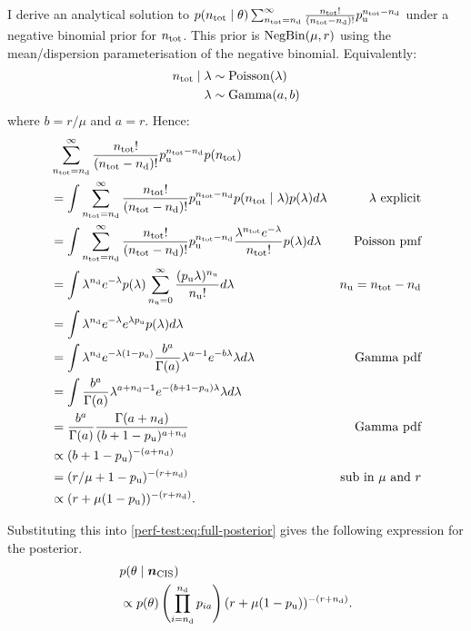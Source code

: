 \documentclass[thesis.tex]{subfiles}
\begin{document}
I derive an analytical solution to $p(n_\text{tot} \mid \theta) \sum_{n_\text{tot}=n_\text{d}}^\infty \frac{n_\text{tot}!}{(n_\text{tot} - n_\text{d})!} p_\text{u}^{n_\text{tot} - n_\text{d}}$ under a negative binomial prior for $n_\text{tot}$.
This prior is $\operatorname{NegBin}(\mu, r)$ using the mean/dispersion parameterisation of the negative binomial.
Equivalently:
\begin{align}
n_\text{tot} \mid \lambda &\sim \operatorname{Poisson}(\lambda) \\
\lambda &\sim \operatorname{Gamma}(a, b)
\end{align}
where $b = r / \mu$ and $a = r$.
Hence:
\begin{align}
&\sum_{n_\text{tot}=n_\text{d}}^\infty \frac{n_\text{tot}!}{(n_\text{tot}-n_\text{d})!} p_\text{u}^{n_\text{tot}-n_\text{d}} p(n_\text{tot}) \\
&= \int \sum_{n_\text{tot}=n_\text{d}}^\infty \frac{n_\text{tot}!}{(n_\text{tot}-n_\text{d})!} p_\text{u}^{n_\text{tot}-n_\text{d}} p(n_\text{tot} \mid \lambda) p(\lambda) d\lambda &\text{$\lambda$ explicit}\\
&= \int \sum_{n_\text{tot}=n_\text{d}}^\infty \frac{n_\text{tot}!}{(n_\text{tot}-n_\text{d})!} p_\text{u}^{n_\text{tot}-n_\text{d}} \frac{\lambda^{n_\text{tot}} e^{-\lambda}}{n_\text{tot}!} p(\lambda) d\lambda &\text{Poisson pmf}\\
&= \int \lambda^{n_\text{d}} e^{-\lambda} p(\lambda) \sum_{n_\text{u}=0}^\infty \frac{(p_\text{u} \lambda)^{n_\text{u}}}{n_\text{u}!} d\lambda &n_\text{u} = n_\text{tot}-n_\text{d}\\
&= \int \lambda^{n_\text{d}} e^{-\lambda} e^{\lambda p_\text{u}} p(\lambda) d\lambda \\
&= \int \lambda^{n_\text{d}} e^{-\lambda(1 - p_\text{u})} \frac{b^a}{\Gamma(a)} \lambda^{a-1} e^{-b\lambda} \lambda d\lambda &\text{Gamma pdf}\\
&= \int \frac{b^a}{\Gamma(a)} \lambda^{a+n_\text{d}-1} e^{-(b+1-p_\text{u})\lambda} \lambda d\lambda \\
&= \frac{b^a}{\Gamma(a)} \frac{\Gamma(a+n_\text{d})}{(b+1-p_\text{u})^{a+n_\text{d}}} &\text{Gamma pdf}\\
&\propto (b+1-p_\text{u})^{-(a+n_\text{d})} \\
&= (r/\mu + 1 - p_\text{u})^{-(r+n_\text{d})} &\text{sub in $\mu$ and $r$}\\
&\propto(r + \mu (1- p_\text{u}))^{-(r+n_\text{d})}.
\end{align}

Substituting this into \cref{perf-test:eq:full-posterior} gives the following expression for the posterior.
\begin{align}
&p(\theta \mid \bm{n_\text{CIS}}) \\
&\propto p(\theta) \left( \prod_{i=n_\text{d}}^{n_\text{d}} p_{ia} \right) (r + \mu (1- p_\text{u}))^{-(r+n_\text{d})} \label{perf-test:eq:full-posterior-simplified}.
\end{align}
\end{document}
